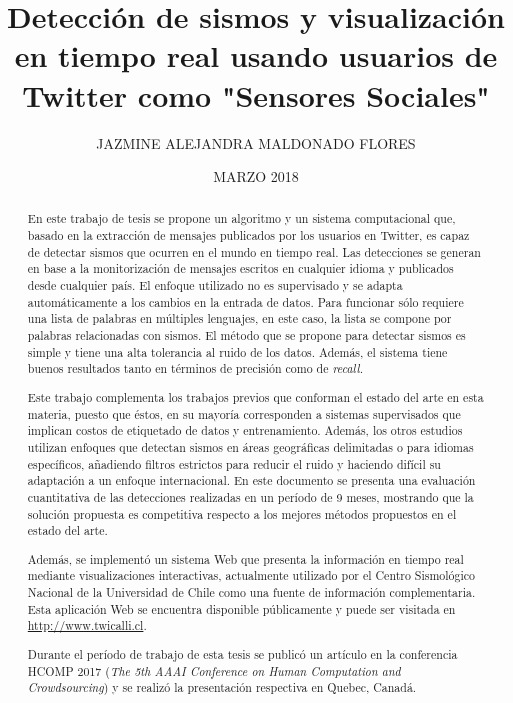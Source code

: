 \documentclass[upright, contnum]{umemoria}
\author{JAZMINE ALEJANDRA MALDONADO FLORES}
\title{Detección de sismos y visualización en tiempo real usando usuarios de Twitter como "Sensores Sociales"}
\date{MARZO 2018}
\begin{document}
\frontmatter
\maketitle

\begin{abstract}
En este trabajo de tesis se propone un algoritmo y un sistema computacional que, basado en la extracción de mensajes publicados por los usuarios en Twitter, es capaz de detectar sismos que ocurren en el mundo en tiempo real. Las detecciones se generan en base a la monitorización de mensajes escritos en cualquier idioma y publicados desde cualquier país. El enfoque utilizado no es supervisado y se adapta automáticamente a los cambios en la entrada de datos. Para funcionar sólo requiere una lista de palabras en múltiples lenguajes, en este caso, la lista se compone por palabras relacionadas con sismos. 
El método que se propone para detectar sismos es simple y tiene una alta tolerancia al ruido de los datos.  Además, el sistema tiene buenos resultados tanto en términos de precisión como de \textit{recall.} 

Este trabajo complementa los trabajos previos que conforman el estado del arte en esta materia, puesto que éstos, en su mayoría corresponden a sistemas supervisados que implican costos de etiquetado de datos y entrenamiento. Además, los otros estudios utilizan enfoques que detectan sismos en áreas geográficas delimitadas o para idiomas específicos, añadiendo filtros estrictos para reducir el ruido y haciendo difícil su adaptación a un enfoque internacional. En este documento se presenta una evaluación cuantitativa de las detecciones realizadas en un período de 9 meses, mostrando que la solución propuesta es competitiva respecto a los mejores métodos propuestos en el estado del arte. 

Además, se implementó un sistema Web que presenta la información en tiempo real mediante visualizaciones interactivas, actualmente utilizado por el Centro Sismológico Nacional de la Universidad de Chile como una fuente de información complementaria. Esta aplicación Web se encuentra disponible públicamente y puede ser visitada en \url{http://www.twicalli.cl}.

Durante el período de trabajo de esta tesis se publicó un artículo en la conferencia HCOMP 2017 (\textit{The 5th AAAI Conference on Human Computation and Crowdsourcing}) y se realizó la presentación respectiva en Quebec, Canadá.  

\end{abstract}
\end{document}
